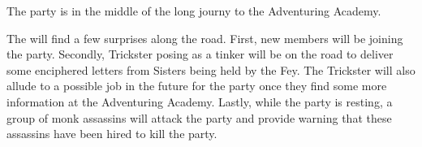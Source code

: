 The party is in the middle of the long journy to the Adventuring Academy.

The will find a few surprises along the road.
First, new members will be joining the party.
Secondly, Trickster posing as a tinker will be on the road to deliver some enciphered letters from Sisters being held by the Fey.
The Trickster will also allude to a possible job in the future for the party once they find some more information at the Adventuring Academy.
Lastly, while the party is resting, a group of monk assassins will attack the party and provide warning that these assassins have been hired to kill the party.